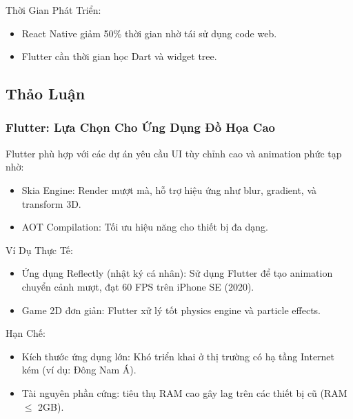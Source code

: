     \begin{flushleft}
      \hspace*{0.8cm}Thời Gian Phát Triển:
      \setlength{\leftmargini}{1.5cm}
      \begin{itemize}
          \item React Native giảm 50\% thời gian nhờ tái sử dụng code web.
          \item Flutter cần thời gian học Dart và widget tree.
      \end{itemize}
    \end{flushleft}

\subsection{Thảo Luận}
\renewcommand{\labelitemi}{--}    
\subsubsection{Flutter: Lựa Chọn Cho Ứng Dụng Đồ Họa Cao}
\begin{flushleft}
  \hspace*{0.8cm}Flutter phù hợp với các dự án yêu cầu UI tùy chỉnh cao và animation phức tạp nhờ:
  \setlength{\leftmargini}{1.5cm}
  \begin{itemize}
    \item Skia Engine: Render mượt mà, hỗ trợ hiệu ứng như blur, gradient, và transform 3D.
    \item AOT Compilation: Tối ưu hiệu năng cho thiết bị đa dạng.
  \end{itemize}
\end{flushleft}

\begin{flushleft}
  \hspace*{0.8cm}Ví Dụ Thực Tế:
  \setlength{\leftmargini}{1.5cm}
  \begin{itemize}
      \item Ứng dụng Reflectly (nhật ký cá nhân): Sử dụng Flutter để tạo animation chuyển cảnh mượt, đạt 60 FPS trên iPhone SE (2020).
      \item Game 2D đơn giản: Flutter xử lý tốt physics engine và particle effects.
  \end{itemize}
\end{flushleft}

\begin{flushleft}
  \hspace*{0.8cm}Hạn Chế:
  \setlength{\leftmargini}{1.5cm}
  \begin{itemize}
      \item Kích thước ứng dụng lớn: Khó triển khai ở thị trường có hạ tầng Internet kém (ví dụ: Đông Nam Á).
      \item Tài nguyên phần cứng: tiêu thụ RAM cao gây lag trên các thiết bị cũ (RAM $\leq$ 2GB).
  \end{itemize}
\end{flushleft}

